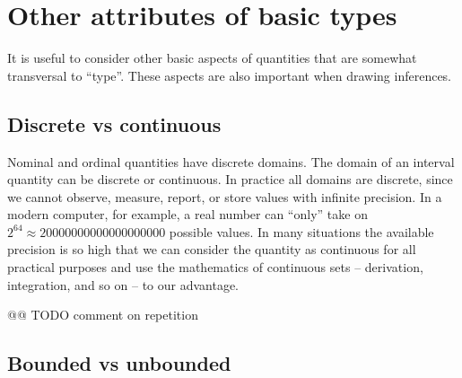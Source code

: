 \documentclass[
  a4paper,
  DIV=11,
  numbers=noendperiod,
  oneside]{scrreprt}
\begin{document}

\hypertarget{other-attributes-of-basic-types}{%
\section{Other attributes of basic
types}\label{other-attributes-of-basic-types}}

It is useful to consider other basic aspects of quantities that are
somewhat transversal to ``type''. These aspects are also important when
drawing inferences.

\hypertarget{discrete-vs-continuous}{%
\subsection{Discrete vs continuous}\label{discrete-vs-continuous}}

Nominal and ordinal quantities have discrete domains. The domain of an
interval quantity can be discrete or continuous. In practice all domains
are discrete, since we cannot observe, measure, report, or store values
with infinite precision. In a modern computer, for example, a real
number can ``only'' take on
\(2^{64} \approx 20 000 000 000 000 000 000\) possible values. In many
situations the available precision is so high that we can consider the
quantity as continuous for all practical purposes and use the
mathematics of continuous sets -- derivation, integration, and so on --
to our advantage.

@@ TODO comment on repetition

\hypertarget{bounded-vs-unbounded}{%
\subsection{Bounded vs unbounded}\label{bounded-vs-unbounded}}
\end{document}
